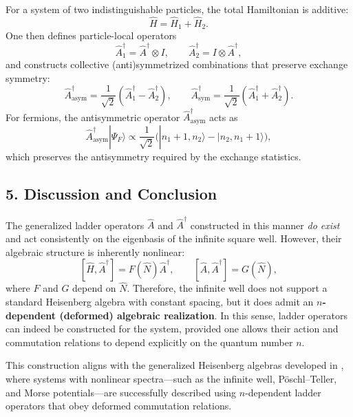 For a system of two indistinguishable particles, the total Hamiltonian is additive:
\[
\hat{H} = \hat{H}_1 + \hat{H}_2.
\]
One then defines particle-local operators
\[
\hat{A}_1^\dagger = \hat{A}^\dagger \otimes I, \qquad
\hat{A}_2^\dagger = I \otimes \hat{A}^\dagger,
\]
and constructs collective (anti)symmetrized combinations that preserve exchange symmetry:
\[
\hat{A}^\dagger_{\text{asym}} = \frac{1}{\sqrt{2}}\left(\hat{A}_1^\dagger - \hat{A}_2^\dagger\right), \qquad
\hat{A}^\dagger_{\text{sym}} = \frac{1}{\sqrt{2}}\left(\hat{A}_1^\dagger + \hat{A}_2^\dagger\right).
\]
For fermions, the antisymmetric operator $\hat{A}^\dagger_{\text{asym}}$ acts as
\[
\hat{A}^\dagger_{\text{asym}}|\Psi_F\rangle \propto 
\frac{1}{\sqrt{2}}\Big(|n_1+1, n_2\rangle - |n_2, n_1+1\rangle\Big),
\]
which preserves the antisymmetry required by the exchange statistics.

\subsection*{5. Discussion and Conclusion}

The generalized ladder operators $\hat{A}$ and $\hat{A}^\dagger$ constructed in this manner \emph{do exist} and act consistently on the eigenbasis of the infinite square well.  
However, their algebraic structure is inherently nonlinear:
\[
[\hat{H},\hat{A}^\dagger] = F(\hat{N})\hat{A}^\dagger, \qquad [\hat{A},\hat{A}^\dagger] = G(\hat{N}),
\]
where $F$ and $G$ depend on $\hat{N}$.  
Therefore, the infinite well does not support a standard Heisenberg algebra with constant spacing, but it does admit an \textbf{$n$-dependent (deformed) algebraic realization}.  
In this sense, ladder operators can indeed be constructed for the system, provided one allows their action and commutation relations to depend explicitly on the quantum number $n$.  

This construction aligns with the generalized Heisenberg algebras developed in \cite{Hussin2011, Jalali2013, Fernandez1999}, where systems with nonlinear spectra---such as the infinite well, Pöschl–Teller, and Morse potentials---are successfully described using $n$-dependent ladder operators that obey deformed commutation relations.


